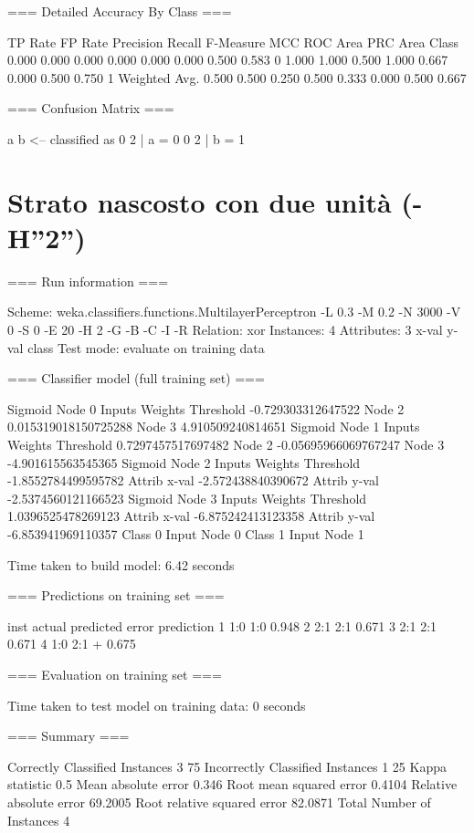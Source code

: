 \documentclass{report}
\begin{document}
	=== Detailed Accuracy By Class ===
	
	TP Rate  FP Rate  Precision  Recall   F-Measure  MCC      ROC Area  PRC Area  Class
	0.000    0.000    0.000      0.000    0.000      0.000    0.500     0.583     0
	1.000    1.000    0.500      1.000    0.667      0.000    0.500     0.750     1
	Weighted Avg.    0.500    0.500    0.250      0.500    0.333      0.000    0.500     0.667     
	
	=== Confusion Matrix ===
	
	a b   <-- classified as
	0 2 | a = 0
	0 2 | b = 1
	
	\section{Strato nascosto con due unità (-H”2”) }
	=== Run information ===
	
	Scheme:       weka.classifiers.functions.MultilayerPerceptron -L 0.3 -M 0.2 -N 3000 -V 0 -S 0 -E 20 -H 2 -G -B -C -I -R
	Relation:     xor
	Instances:    4
	Attributes:   3
	x-val
	y-val
	class
	Test mode:    evaluate on training data
	
	=== Classifier model (full training set) ===
	
	Sigmoid Node 0
	Inputs    Weights
	Threshold    -0.729303312647522
	Node 2    0.015319018150725288
	Node 3    4.910509240814651
	Sigmoid Node 1
	Inputs    Weights
	Threshold    0.7297457517697482
	Node 2    -0.05695966069767247
	Node 3    -4.901615563545365
	Sigmoid Node 2
	Inputs    Weights
	Threshold    -1.8552784499595782
	Attrib x-val    -2.572438840390672
	Attrib y-val    -2.5374560121166523
	Sigmoid Node 3
	Inputs    Weights
	Threshold    1.0396525478269123
	Attrib x-val    -6.875242413123358
	Attrib y-val    -6.853941969110357
	Class 0
	Input
	Node 0
	Class 1
	Input
	Node 1
	
	
	Time taken to build model: 6.42 seconds
	
	=== Predictions on training set ===
	
	inst     actual  predicted error prediction
	1        1:0        1:0       0.948 
	2        2:1        2:1       0.671 
	3        2:1        2:1       0.671 
	4        1:0        2:1   +   0.675 
	
	=== Evaluation on training set ===
	
	Time taken to test model on training data: 0 seconds
	
	=== Summary ===
	
	Correctly Classified Instances           3               75      %
	Incorrectly Classified Instances         1               25      %
	Kappa statistic                          0.5   
	Mean absolute error                      0.346 
	Root mean squared error                  0.4104
	Relative absolute error                 69.2005 %
	Root relative squared error             82.0871 %
	Total Number of Instances                4     
	
\end{document}
